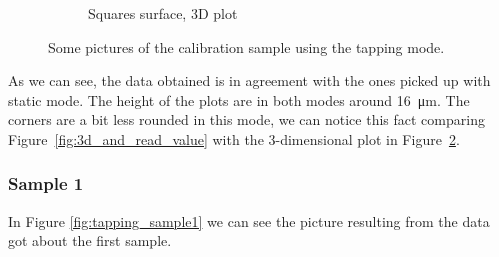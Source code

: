 \documentclass[11pt,a4paper]{article}
\begin{document}
\begin{figure}[H]
\begin{subfigure}[b]{0.42\textwidth}
\caption{Squares surface, 3D plot}
\label{fig:sm_border}
\end{subfigure}
\caption{Some pictures of the calibration sample using the tapping mode.}\label{fig:: tm cal}
\end{figure}
As we can see, the data obtained is in agreement with the ones picked up with static mode. The height of the plots are in both modes around \SI{16}{\micro\m}. The corners are a bit less rounded in this mode, we can notice this fact comparing Figure~\ref{fig:3d_and_read_value} with the 3-dimensional plot in Figure~\ref{fig:: tm cal}.

\subsubsection{Sample 1}
In Figure \ref{fig:tapping_sample1} we can see the picture resulting from the data got about the first sample.
\end{document}

